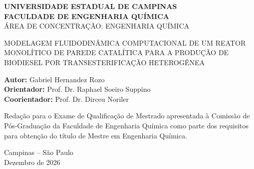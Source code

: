 \begin{titlepage}
\begin{center}

{\large\bfseries UNIVERSIDADE ESTADUAL DE CAMPINAS}\\[2pt]
{\large\bfseries FACULDADE DE ENGENHARIA QUÍMICA}\\[14pt]

{\normalsize ÁREA DE CONCENTRAÇÃO: ENGENHARIA QUÍMICA}


\vspace{4.5cm}

{\normalsize
MODELAGEM FLUIDODINÂMICA COMPUTACIONAL DE UM REATOR\\
MONOLÍTICO DE PAREDE CATALÍTICA PARA A PRODUÇÃO DE\\
BIODIESEL POR TRANSESTERIFICAÇÃO HETEROGÊNEA
}

\vspace{4.5cm}

\end{center}

\noindent\textbf{Autor:} Gabriel Hernandez Rozo\\[4pt]
\noindent\textbf{Orientador:} Prof. Dr. Raphael Soeiro Suppino\\[4pt]
\noindent\textbf{Coorientador:} Prof. Dr. Dirceu Noriler

\vspace{2.0cm}

\noindent\parbox{\textwidth}{\normalsize
Redação para o Exame de Qualificação de Mestrado apresentada à Comissão de
Pós-Graduação da Faculdade de Engenharia Química como parte dos requisitos
para obtenção do título de Mestre em Engenharia Química.}

\vfill

\begin{center}
Campinas -- São Paulo\\
Dezembro de 2026
\end{center}

\end{titlepage}
